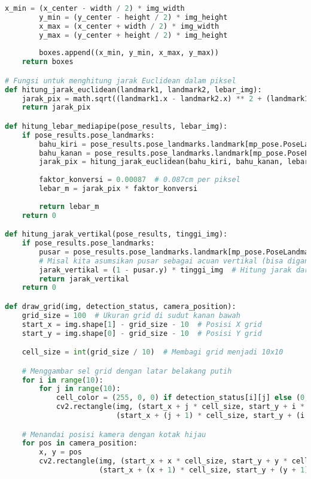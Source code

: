 \begin{lstlisting}[language=Python]
        x_min = (x_center - width / 2) * img_width
        y_min = (y_center - height / 2) * img_height
        x_max = (x_center + width / 2) * img_width
        y_max = (y_center + height / 2) * img_height
        
        boxes.append((x_min, y_min, x_max, y_max))
    return boxes

# Fungsi untuk menghitung jarak Euclidean dalam piksel
def hitung_jarak_euclidean(landmark1, landmark2, lebar_img):
    jarak_pix = math.sqrt((landmark1.x - landmark2.x) ** 2 + (landmark1.y - landmark2.y) ** 2) * lebar_img
    return jarak_pix

def hitung_lebar_mediapipe(pose_results, lebar_img):
    if pose_results.pose_landmarks:
        bahu_kiri = pose_results.pose_landmarks.landmark[mp_pose.PoseLandmark.LEFT_SHOULDER]
        bahu_kanan = pose_results.pose_landmarks.landmark[mp_pose.PoseLandmark.RIGHT_SHOULDER]
        jarak_pix = hitung_jarak_euclidean(bahu_kiri, bahu_kanan, lebar_img)
        
        faktor_konversi = 0.00087  # 0.087cm per piksel
        lebar_m = jarak_pix * faktor_konversi
        
        return lebar_m
    return 0

def hitung_jarak_vertikal(pose_results, tinggi_img):
    if pose_results.pose_landmarks:
        pusar = pose_results.pose_landmarks.landmark[mp_pose.PoseLandmark.NOSE]
        # Misal kita asumsikan pusar sebagai acuan vertikal (bisa diganti sesuai dengan landmark yang sesuai)
        jarak_vertikal = (1 - pusar.y) * tinggi_img  # Hitung jarak dari atas gambar ke pusar
        return jarak_vertikal
    return 0

def draw_grid(img, detection_status, camera_position):
    grid_size = 100  # Ukuran grid di sudut kanan bawah
    start_x = img.shape[1] - grid_size - 10  # Posisi X grid
    start_y = img.shape[0] - grid_size - 10  # Posisi Y grid

    cell_size = int(grid_size / 10)  # Membagi grid menjadi 10x10

    # Menggambar sel grid dengan latar belakang putih
    for i in range(10):
        for j in range(10):
            cell_color = (255, 0, 0) if detection_status[i][j] else (0, 0, 0)
            cv2.rectangle(img, (start_x + j * cell_size, start_y + i * cell_size),
                          (start_x + (j + 1) * cell_size, start_y + (i + 1) * cell_size), cell_color, -1)

    # Menandai posisi kamera dengan kotak hijau
    for pos in camera_position:
        x, y = pos
        cv2.rectangle(img, (start_x + x * cell_size, start_y + y * cell_size),
                      (start_x + (x + 1) * cell_size, start_y + (y + 1) * cell_size), (0, 255, 0), -1)
        

\end{lstlisting}
